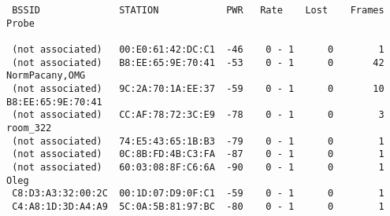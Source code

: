 \documentclass[10pt,a4paper]{article}
\begin{document}
\begin{itemize}
\begin{lstlisting}
 BSSID              STATION            PWR   Rate    Lost    Frames  Probe                                                                                                                                                                   
                                                                                                                                                                                                                                             
 (not associated)   00:E0:61:42:DC:C1  -46    0 - 1      0        1                                                                                                                                                                          
 (not associated)   B8:EE:65:9E:70:41  -53    0 - 1      0       42  NormPacany,OMG                                                                                                                                                          
 (not associated)   9C:2A:70:1A:EE:37  -59    0 - 1      0       10                                               B8:EE:65:9E:70:41                                                                                                                           
 (not associated)   CC:AF:78:72:3C:E9  -78    0 - 1      0        3  room_322                                                                                                                                                                
 (not associated)   74:E5:43:65:1B:B3  -79    0 - 1      0        1                                                                                                                                                                          
 (not associated)   0C:8B:FD:4B:C3:FA  -87    0 - 1      0        1                                                                                                                                                                          
 (not associated)   60:03:08:8F:C6:6A  -90    0 - 1      0        1  Oleg                                                                                                                                                                    
 C8:D3:A3:32:00:2C  00:1D:07:D9:0F:C1  -59    0 - 1      0        1                                                                                                                                                                          
 C4:A8:1D:3D:A4:A9  5C:0A:5B:81:97:BC  -80    0 - 1      0        1                                                                                                                                                                          

\end{lstlisting}
\end{itemize}
\end{document}
